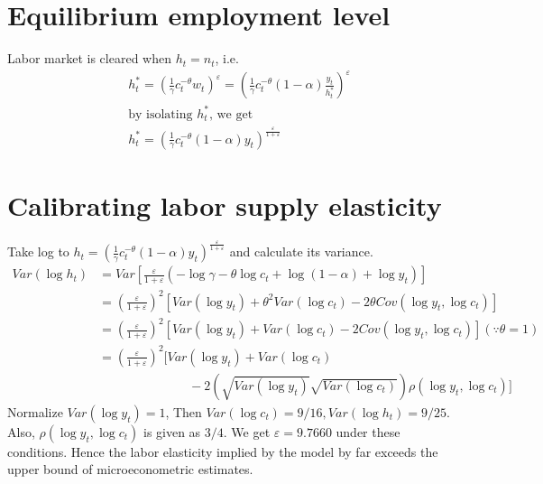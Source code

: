 \documentclass[12pt]{amsart}
\begin{document}
\section{Equilibrium employment level}
Labor market is cleared when $h_t = n_t$, i.e. 
\begin{align*}
&h_t^{*} = \left( \frac{1}{\gamma} c_t^{-\theta} w_t \right)^\varepsilon = \left( \frac{1}{\gamma} c_t^{-\theta} (1-\alpha) \frac{y_t}{h_t^{*}} \right)^\varepsilon \\
&\text{by isolating $h_t^{*}$, we get} \\
&h_t^{*} = \left(  \frac{1}{\gamma} c_t^{-\theta} (1-\alpha) y_t  \right)^{\frac{\varepsilon}{1+\varepsilon}}
\end{align*}

\section{Calibrating labor supply elasticity}
Take log to $h_t = \left(  \frac{1}{\gamma} c_t^{-\theta} (1-\alpha) y_t  \right)^{\frac{\varepsilon}{1+\varepsilon}}$ and calculate its variance. 
\begin{align*}
Var(\log h_t) &= Var \left[ \frac{\varepsilon}{1+\varepsilon} \left( -\log \gamma -\theta \log c_t + \log (1-\alpha) + \log y_t  \right) \right] \\
& = \left( \frac{\varepsilon}{1+ \varepsilon}\right)^2 \left[ Var(\log y_t) + \theta^2 Var(\log c_t) - 2\theta Cov(\log y_t, \log c_t) \right] \\
& = \left( \frac{\varepsilon}{1+ \varepsilon}\right)^2 \left[ Var(\log y_t) +  Var(\log c_t) - 2 Cov(\log y_t, \log c_t) \right] (\because \theta = 1) \\
& = \left( \frac{\varepsilon}{1+ \varepsilon}\right)^2 \Bigg[ Var(\log y_t) +  Var(\log c_t) \\
& \hspace{3cm} - 2 \left( \sqrt{Var(\log y_t)} \sqrt{Var(\log c_t)} \right)\rho(\log y_t, \log c_t) \Bigg]
\end{align*}
Normalize $Var(\log y_t) = 1$, Then $Var(\log c_t) = 9/16, Var(\log h_t) = 9/25$. Also, $\rho(\log y_t, \log c_t)$ is given as $3/4$. We get $\varepsilon = 9.7660$ under these conditions. Hence the labor elasticity implied by the model by far exceeds the upper bound of microeconometric estimates. 
\end{document}
